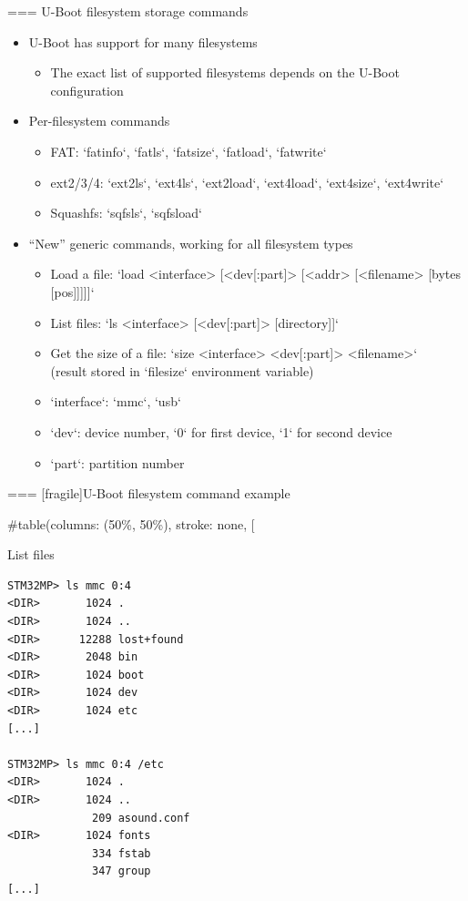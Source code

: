 === {U-Boot filesystem storage commands}
  \begin{itemize}
  \item U-Boot has support for many filesystems
    \begin{itemize}
    \item The exact list of supported filesystems depends on the U-Boot
      configuration
    \end{itemize}
  \item Per-filesystem commands
    \begin{itemize}
    \item FAT: `fatinfo`, `fatls`, `fatsize`,
      `fatload`, `fatwrite`
    \item ext2/3/4: `ext2ls`, `ext4ls`, `ext2load`,
      `ext4load`, `ext4size`, `ext4write`
    \item Squashfs: `sqfsls`, `sqfsload`
    \end{itemize}
  \item ``New'' generic commands, working for all filesystem types
    \begin{itemize}
    \item Load a file: `load <interface> [<dev[:part]> [<addr> [<filename> [bytes [pos]]]]]`
    \item List files: `ls <interface> [<dev[:part]> [directory]]`
    \item Get the size of a file: `size <interface> <dev[:part]> <filename>`\\
	  (result stored in `filesize` environment variable)
    \item `interface`: `mmc`, `usb`
    \item `dev`: device number, `0` for first device, `1` for second device
    \item `part`: partition number
    \end{itemize}
  \end{itemize}


=== [fragile]{U-Boot filesystem command example}
  
#table(columns: (50\%, 50\%), stroke: none,
[
    \begin{block}{List files}
      {\tiny
\begin{verbatim}
STM32MP> ls mmc 0:4
<DIR>       1024 .
<DIR>       1024 ..
<DIR>      12288 lost+found
<DIR>       2048 bin
<DIR>       1024 boot
<DIR>       1024 dev
<DIR>       1024 etc
[...]

STM32MP> ls mmc 0:4 /etc
<DIR>       1024 .
<DIR>       1024 ..
             209 asound.conf
<DIR>       1024 fonts
             334 fstab
             347 group
[...]
\end{verbatim}
      }
    \end{block}

